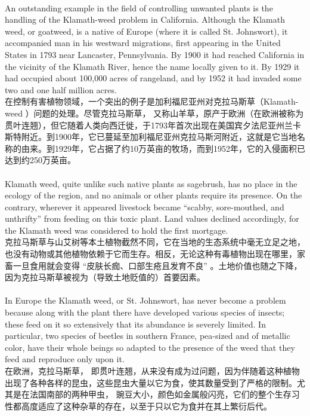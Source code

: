 \documentclass{article}
\begin{document}
\\
An outstanding example in the field of controlling unwanted plants is the handling of the Klamath-weed problem in California. Although the Klamath weed, or goatweed, is a native of Europe (where it is called St. Johnswort), it accompanied man in his westward migrations, first appearing in the United States in 1793 near Lancaster, Pennsylvania. By 1900 it had reached California in the vicinity of the Klamath River, hence the name locally given to it. By 1929 it had occupied about 100,000 acres of rangeland, and by 1952 it had invaded some two and one half million acres.\\
在控制有害植物领域，一个突出的例子是加利福尼亚州对克拉马斯草（Klamath-weed ）问题的处理。尽管克拉马斯草， 又称山羊草，原产于欧洲（在欧洲被称为贯叶连翘），但它随着人类向西迁徙，于1793年首次出现在美国宾夕法尼亚州兰卡斯特附近。到1900年，它已蔓延至加利福尼亚州克拉马斯河附近，这就是它当地名称的由来。到1929年，它占据了约10万英亩的牧场，而到1952年，它的入侵面积已达到约250万英亩。 \\

\\
Klamath weed, quite unlike such native plants as sagebrush, has no place in the ecology of the region, and no animals or other plants require its presence. On the contrary, wherever it appeared livestock became “scabby, sore-mouthed, and unthrifty” from feeding on this toxic plant. Land values declined accordingly, for the Klamath weed was considered to hold the first mortgage.\\
克拉马斯草与山艾树等本土植物截然不同，它在当地的生态系统中毫无立足之地，也没有动物或其他植物依赖于它而生存。相反，无论这种有毒植物出现在哪里，家畜一旦食用就会变得 “皮肤长痂、口部生疮且发育不良” 。土地价值也随之下降，因为克拉马斯草被视为（导致土地贬值的）首要因素。 \\

\\
In Europe the Klamath weed, or St. Johnswort, has never become a problem because along with the plant there have developed various species of insects; these feed on it so extensively that its abundance is severely limited. In particular, two species of beetles in southern France, pea-sized and of metallic color, have their whole beings so adapted to the presence of the weed that they feed and reproduce only upon it.\\
在欧洲，克拉马斯草， 即贯叶连翘，从来没有成为过问题，因为伴随着这种植物出现了各种各样的昆虫，这些昆虫大量以它为食，使其数量受到了严格的限制。尤其是在法国南部的两种甲虫， 豌豆大小，颜色如金属般闪亮，它们的整个生存习性都高度适应了这种杂草的存在，以至于只以它为食并在其上繁衍后代。 \\
\end{document}
